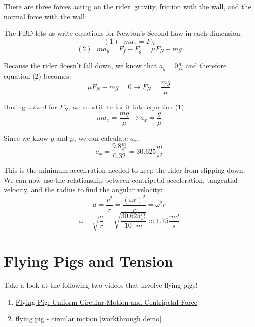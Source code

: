 \begin{Answer}[ref = gravitron]
  There are three forces acting on the rider: gravity, friction with the wall, and the normal force with the wall:

  \begin{center}
  \end{center}

  The FBD lets us write equations for Newton's Second Law in each dimension:
  $$\left( 1 \right) \text{ }ma_x = F_N$$
  $$\left( 2 \right) \text{ }ma_y = F_f - F_g = \mu F_N - mg$$

  Because the rider doesn't fall down, we know that $a_y = 0 \frac{m}{s^2}$ and therefore equation (2) becomes:
  $$\mu F_N - mg = 0 \to F_N = \frac{mg}{\mu}$$

  Having solved for $F_N$, we substitute for it into equation (1):
  $$ma_x = \frac{mg}{\mu} \to a_x = \frac{g}{\mu}$$

  Since we know $g$ and $\mu$, we can calculate $a_x$:
  $$a_x = \frac{9.8 \frac{m}{s^2}}{0.32} = 30.625 \frac{m}{s^2}$$

  This is the minimum acceleration needed to keep the rider from slipping down. We can now use the relationship between centripetal acceleration, tangential velocity, and the radius to find the angular velocity:
  $$a = \frac{v^2}{r} = \frac{\left( \omega r \right)^2}{r} = \omega^2 r$$
  $$\omega = \sqrt{\frac{a}{r}} = \sqrt{\frac{30.625 \frac{m}{s^2}}{10 \text{ } m}} \approx 1.75 \frac{rad}{s}$$
\end{Answer}

\section{Flying Pigs and Tension}
Take a look at the following two videos that involve flying pigs!
\begin{enumerate}
  \item \href{https://youtu.be/vsSID5irx4o}{Flying Pig: Uniform Circular Motion and Centripetal Force}
  \item \href{https://www.youtube.com/watch?v=7WO2DZOsYY4}{flying pig - circular motion [workthrough demo]}
\end{enumerate}

